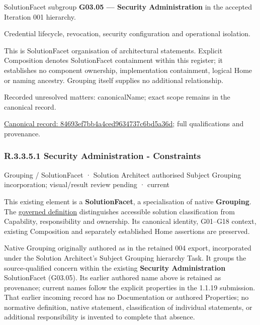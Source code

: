 SolutionFacet subgroup \textbf{G03.05 — Security Administration} in the accepted Iteration 001 hierarchy.



Credential lifecycle, revocation, security configuration and operational isolation.



This is SolutionFacet organisation of architectural statements. Explicit Composition denotes SolutionFacet containment within this register; it establishes no component ownership, implementation containment, logical Home or naming ancestry. Grouping itself supplies no additional relationship.


{\small Recorded unresolved matters: canonicalName; exact scope remains in the canonical record.}\par
{\footnotesize \href{../../../../../../../continuum/grouping/84693ef7bb4a4ced9634737c6bd5a36d.md}{Canonical record: 84693ef7bb4a4ced9634737c6bd5a36d}; full qualifications and provenance.}\par
\subsubsection*{R.3.3.5.1 Security Administration - Constraints}
\label{navigation:R.3.3.5.1}

\label{element:f9035f49dbab4676b23ab9e4f45678f9}
{\small Grouping / SolutionFacet · Solution Architect authorised Subject Grouping incorporation; visual/result review pending · current}\par

This existing element is a \textbf{SolutionFacet}, a specialisation of native
\textbf{Grouping}. The \href{\detokenize{../../../../../../../governance/continuum-representation.md#solutionfacet-classification--1119-candidate}}{governed definition}
distinguishes accessible solution classification from Capability, responsibility
and ownership. Its canonical identity, G01–G18 context, existing Composition
and separately established Home assertions are preserved.



Native Grouping originally authored as \texttt{} in the retained 004 export,
incorporated under the Solution Architect's Subject Grouping hierarchy Task.
It groups the source-qualified \texttt{} concern within
the existing \textbf{Security Administration} SolutionFacet (G03.05). Its earlier authored name above is retained as provenance; current names
follow the explicit properties in the 1.1.19 submission.
That earlier incoming record has no Documentation or authored Properties; no normative
definition, native statement, classification of individual statements, or
additional responsibility is invented to complete that absence.



